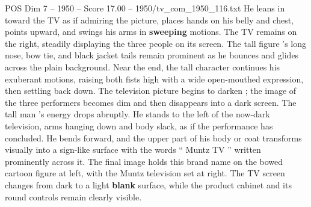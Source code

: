 \begin{textsample}{POS Dim 7 – 1950 – Score 17.00 – 1950/tv\_com\_1950\_116.txt}
He leans in toward the TV as if admiring the picture, places hands on his belly and chest, points upward, and swings his arms in \textbf{sweeping} motions.
The TV remains on the right, steadily displaying the three people on its screen.
The tall figure ’s long nose, bow tie, and black jacket tails remain prominent as he bounces and glides across the plain background.
Near the end, the tall character continues his exuberant motions, raising both fists high with a wide open-mouthed expression, then settling back down.
The television picture begins to darken ; the image of the three performers becomes dim and then disappears into a dark screen.
The tall man ’s energy drops abruptly.
He stands to the left of the now-dark television, arms hanging down and body slack, as if the performance has concluded.
He bends forward, and the upper part of his body or coat transforms visually into a sign-like surface with the words “ Muntz TV ” written prominently across it.
The final image holds this brand name on the bowed cartoon figure at left, with the Muntz television set at right.
The TV screen changes from dark to a light \textbf{blank} surface, while the product cabinet and its round controls remain clearly visible.

\end{textsample}
